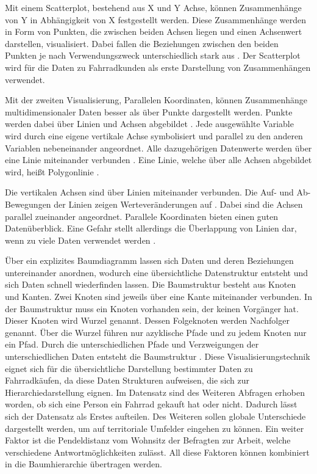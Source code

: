 \documentclass[usegeometry=true]{scrartcl}
\begin{document}
Mit einem Scatterplot, bestehend aus X und Y Achse, können Zusammenhänge von Y in Abhängigkeit von X festgestellt werden. Diese Zusammenhänge werden in Form von Punkten, die zwischen beiden Achsen liegen und einen Achsenwert darstellen, visualisiert. Dabei fallen die Beziehungen zwischen den beiden Punkten je nach  Verwendungszweck unterschiedlich stark aus \cite{Yi.16.10.2019,Anscombe.1973,Cleveland.1984}. Der Scatterplot wird für die Daten zu Fahrradkunden als erste Darstellung von Zusammenhängen verwendet. 

Mit der zweiten Visualisierung, Parallelen Koordinaten, können Zusammenhänge multidimensionaler Daten besser als über Punkte dargestellt werden. Punkte werden dabei über Linien und Achsen  abgebildet \cite{Inselberg.1990}. Jede ausgewählte Variable wird durch eine eigene vertikale Achse symbolisiert und parallel zu den anderen Variablen nebeneinander angeordnet. Alle dazugehörigen Datenwerte werden über eine Linie miteinander verbunden \cite{Moustafa.2006}. Eine Linie, welche über alle Achsen abgebildet wird, heißt Polygonlinie \cite{Heinrich.2015}. 

Die vertikalen Achsen sind über Linien miteinander verbunden. Die Auf- und Ab-Bewegungen der Linien zeigen Werteveränderungen auf \cite{Few.2008}. 
Dabei sind die Achsen parallel zueinander angeordnet. Parallele Koordinaten bieten einen guten Datenüberblick. Eine Gefahr stellt allerdings die Überlappung von Linien dar, wenn zu viele Daten verwendet werden \cite{Heinrich.2009}.

Über ein explizites Baumdiagramm lassen sich Daten und deren Beziehungen untereinander anordnen, wodurch eine übersichtliche Datenstruktur entsteht und sich Daten schnell wiederfinden lassen. Die Baumstruktur besteht aus Knoten und Kanten. Zwei Knoten sind jeweils über eine Kante miteinander verbunden. In der Baumstruktur muss ein Knoten vorhanden sein, der keinen Vorgänger hat. Dieser Knoten wird Wurzel genannt. Dessen Folgeknoten werden Nachfolger genannt. Über die Wurzel führen nur azyklische Pfade und zu jedem Knoten nur ein Pfad. Durch die unterschiedlichen Pfade und Verzweigungen der unterschiedlichen Daten entsteht die Baumstruktur \cite{Gumm.2016}. Diese Visualisierungstechnik eignet sich für die übersichtliche Darstellung bestimmter Daten zu Fahrradkäufen, da diese Daten Strukturen aufweisen, die sich zur Hierarchiedarstellung eignen. Im Datensatz sind des Weiteren Abfragen erhoben worden, ob sich eine Person ein Fahrrad gekauft hat oder nicht. Dadurch lässt sich der Datensatz als Erstes aufteilen. Des Weiteren sollen globale Unterschiede dargestellt werden, um auf territoriale Umfelder eingehen zu können. Ein weiter Faktor ist die Pendeldistanz vom Wohnsitz der Befragten zur Arbeit, welche verschiedene Antwortmöglichkeiten zulässt. All diese Faktoren können kombiniert in die Baumhierarchie übertragen werden.   
\end{document}
